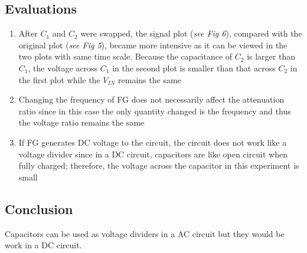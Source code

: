 \documentclass[journal, letterpaper]{IEEEtran}
\begin{document}
\subsection{Evaluations}
    \begin{enumerate}
    \item After $C_1$ and $C_2$ were swapped, the signal plot (\textit{see Fig 6}), compared with the original plot (\textit{see Fig 5}), became more intensive as it can be viewed in the two plots with same time scale. Because the capacitance of $C_2$ is larger than $C_1$, the voltage across $C_1$ in the second plot is smaller than that across $C_2$ in the first plot while the $V_{IN}$ remains the same
\item Changing the frequency of FG does not necessarily affect the attenuation ratio since in this case the only quantity changed is the frequency and thus the voltage ratio remains the same
\item If FG generates DC voltage to the circuit, the circuit does not work like a voltage divider since in a DC circuit, capacitors are like open circuit when fully charged; therefore, the voltage across the capacitor in this experiment is small
    \end{enumerate}
    \subsection{Conclusion}
		Capacitors can be used as voltage dividers in a AC circuit but they would be work in a DC circuit. 
\end{document}
